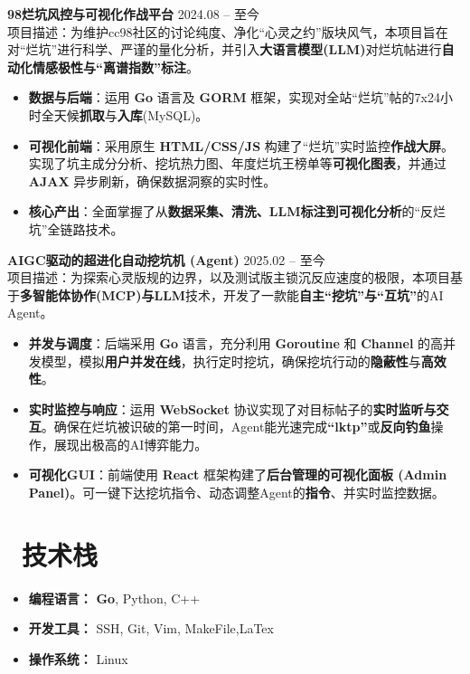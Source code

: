 \documentclass[11pt]{article}
\newlength{\interProjectSpacing}
\newcommand{\projectsep}{\vspace{\interProjectSpacing}}
\newlength{\intraProjectTitleSep}
\newcommand{\titlebreak}{\\[\intraProjectTitleSep]}
\newlength{\intraProjectListTopSep}
\begin{document}
\textbf{98烂坑风控与可视化作战平台} \hfill 2024.08 -- 至今 \titlebreak
项目描述：为维护cc98社区的讨论纯度、净化“心灵之约”版块风气，本项目旨在对“烂坑”进行科学、严谨的量化分析，并引入\textbf{大语言模型(LLM)}对烂坑帖进行\textbf{自动化情感极性与“离谱指数”标注}。
\begin{itemize}[nosep, topsep=\intraProjectListTopSep]
    \item \textbf{数据与后端}：运用 \textbf{Go} 语言及 \textbf{GORM} 框架，实现对全站“烂坑”帖的7x24小时全天候\textbf{抓取}与\textbf{入库}(MySQL)。
    \item \textbf{可视化前端}：采用原生 \textbf{HTML/CSS/JS} 构建了“烂坑”实时监控\textbf{作战大屏}。实现了坑主成分分析、挖坑热力图、年度烂坑王榜单等\textbf{可视化图表}，并通过 \textbf{AJAX} 异步刷新，确保数据洞察的实时性。
    \item \textbf{核心产出}：全面掌握了从\textbf{数据采集、清洗、LLM标注到可视化分析}的“反烂坑”全链路技术。
\end{itemize}

\projectsep

\textbf{AIGC驱动的超进化自动挖坑机 (Agent)} \hfill 2025.02 -- 至今 \titlebreak
项目描述：为探索心灵版规的边界，以及测试版主锁沉反应速度的极限，本项目基于\textbf{多智能体协作(MCP)与LLM}技术，开发了一款能\textbf{自主“挖坑”与“互坑”}的AI Agent。
\begin{itemize}[nosep, topsep=\intraProjectListTopSep]
    \item \textbf{并发与调度}：后端采用 \textbf{Go} 语言，充分利用 \textbf{Goroutine} 和 \textbf{Channel} 的高并发模型，模拟\textbf{用户并发在线}，执行定时挖坑，确保挖坑行动的\textbf{隐蔽性}与\textbf{高效性}。
    \item \textbf{实时监控与响应}：运用 \textbf{WebSocket} 协议实现了对目标帖子的\textbf{实时监听与交互}。确保在烂坑被识破的第一时间，Agent能光速完成\textbf{“lktp”}或\textbf{反向钓鱼}操作，展现出极高的AI博弈能力。
    \item \textbf{可视化GUI}：前端使用 \textbf{React} 框架构建了\textbf{后台管理的可视化面板 (Admin Panel)}。可一键下达挖坑指令、动态调整Agent的\textbf{指令}、并实时监控数据。
\end{itemize}

\section{\makebox[\widthof{\faCogs}][c]{\color{CVBlue}\faCogs}\ 技术栈}
\begin{itemize}[nosep]
    \item \textbf{编程语言：} \textbf{Go}, Python, C++
    \item \textbf{开发工具：} SSH, Git, Vim, MakeFile,LaTex
    \item \textbf{操作系统：} Linux
\end{itemize}
\end{document}
